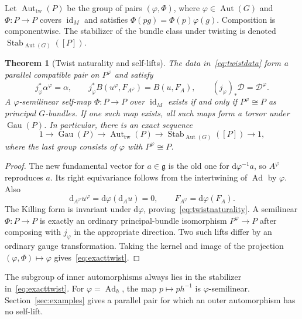 \documentclass[11pt]{amsart}
\newcommand{\g}{\mathfrak g}
\newcommand{\Ad}{\operatorname{Ad}}
\newcommand{\Gau}{\operatorname{Gau}}
\newcommand{\dd}{\mathrm d}
\newcommand{\id}{\operatorname{id}}
\theoremstyle{plain}
\newtheorem{theorem}{Theorem}[section]
\theoremstyle{definition}
\theoremstyle{remark}
\begin{document}
Let $\operatorname{Aut}_{\mathrm{tw}}(P)$ be the group of pairs $(\varphi,\Phi)$, where $\varphi\in\operatorname{Aut}(G)$ and $\Phi:P\to P$ covers $\id_M$ and satisfies $\Phi(pg)=\Phi(p)\varphi(g)$.  Composition is componentwise.  The stabilizer of the bundle class under twisting is denoted $\operatorname{Stab}_{\operatorname{Aut}(G)}([P])$.

\begin{theorem}[Twist naturality and self-lifts]\label{thm:twist}
The data in~\eqref{eq:twistdata} form a parallel compatible pair on $P^\varphi$ and satisfy
\begin{equation}\label{eq:twistnaturality}
 j_\varphi^*\alpha^\varphi=\alpha,
 \qquad j_\varphi^*B(u^\varphi,F_{A^\varphi})=B(u,F_A),
 \qquad (j_\varphi)_*\mathcal D=\mathcal D^\varphi.
\end{equation}
A $\varphi$-semilinear self-map $\Phi:P\to P$ over $\id_M$ exists if and only if $P^\varphi\cong P$ as principal $G$-bundles.  If one such map exists, all such maps form a torsor under $\Gau(P)$.  In particular, there is an exact sequence
\begin{equation}\label{eq:exacttwist}
1\longrightarrow\Gau(P)\longrightarrow
\operatorname{Aut}_{\mathrm{tw}}(P)\longrightarrow
\operatorname{Stab}_{\operatorname{Aut}(G)}([P])\longrightarrow1,
\end{equation}
where the last group consists of $\varphi$ with $P^\varphi\cong P$.
\end{theorem}

\begin{proof}
The new fundamental vector for $a\in\g$ is the old one for $\dd\varphi^{-1}a$, so $A^\varphi$ reproduces $a$.  Its right equivariance follows from the intertwining of $\Ad$ by $\varphi$.  Also
\[
 \dd_{A^\varphi}u^\varphi
 =\dd\varphi(\dd_Au)=0,
 \qquad F_{A^\varphi}=\dd\varphi(F_A).
\]
The Killing form is invariant under $\dd\varphi$, proving~\eqref{eq:twistnaturality}.  A semilinear $\Phi:P\to P$ is exactly an ordinary principal-bundle isomorphism $P^\varphi\to P$ after composing with $j_\varphi$ in the appropriate direction.  Two such lifts differ by an ordinary gauge transformation.  Taking the kernel and image of the projection $(\varphi,\Phi)\mapsto\varphi$ gives~\eqref{eq:exacttwist}.
\end{proof}

The subgroup of inner automorphisms always lies in the stabilizer in~\eqref{eq:exacttwist}.  For $\varphi=\Ad_h$, the map $p\mapsto p h^{-1}$ is $\varphi$-semilinear.  Section~\ref{sec:examples} gives a parallel pair for which an outer automorphism has no self-lift.
\end{document}
